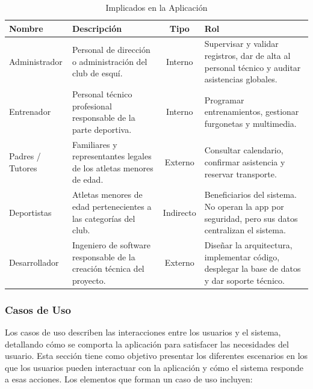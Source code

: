         \begin{table}[htbp]
            \centering
            \begin{tabularx}{\textwidth}{|l|>{\raggedright\arraybackslash}X|c|>{\raggedright\arraybackslash}X|}
            \hline
            \textbf{Nombre} & \textbf{Descripción} & \textbf{Tipo} & \textbf{Rol} \\ \hline
            Administrador & Personal de dirección o administración del club de esquí. & Interno & Supervisar y validar registros, dar de alta al personal técnico y auditar asistencias globales. \\ \hline
            Entrenador & Personal técnico profesional responsable de la parte deportiva. & Interno & Programar entrenamientos, gestionar furgonetas y multimedia. \\ \hline
            Padres / Tutores & Familiares y representantes legales de los atletas menores de edad. & Externo & Consultar calendario, confirmar asistencia y reservar transporte. \\ \hline
            Deportistas & Atletas menores de edad pertenecientes a las categorías del club. & Indirecto & Beneficiarios del sistema. No operan la app por seguridad, pero sus datos centralizan el sistema. \\ \hline
            Desarrollador & Ingeniero de software responsable de la creación técnica del proyecto. & Externo & Diseñar la arquitectura, implementar código, desplegar la base de datos y dar soporte técnico. \\ \hline
            \end{tabularx}
            \caption{Implicados en la Aplicación}
            \label{tab:implicados_aplicacion}
        \end{table}
        \newpage
        \subsubsection{Casos de Uso}
        Los casos de uso describen las interacciones entre los usuarios y el sistema, detallando cómo se comporta la aplicación para satisfacer las necesidades del usuario. Esta sección tiene como objetivo presentar los diferentes escenarios en los que los usuarios pueden interactuar con la aplicación y cómo el sistema responde a esas acciones. Los elementos que forman un caso de uso incluyen:

